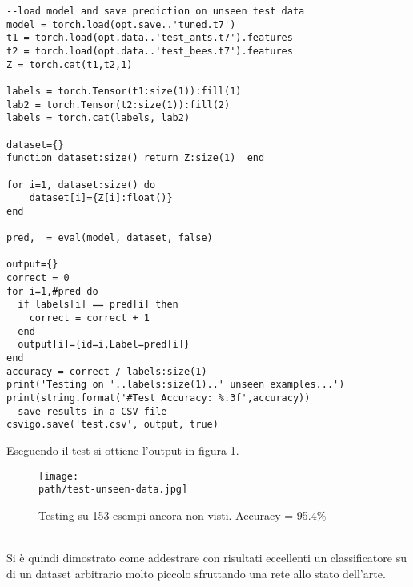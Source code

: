 \begin{lstlisting}[language={[5.2]Lua}]
--load model and save prediction on unseen test data
model = torch.load(opt.save..'tuned.t7')
t1 = torch.load(opt.data..'test_ants.t7').features
t2 = torch.load(opt.data..'test_bees.t7').features
Z = torch.cat(t1,t2,1)

labels = torch.Tensor(t1:size(1)):fill(1)
lab2 = torch.Tensor(t2:size(1)):fill(2)
labels = torch.cat(labels, lab2)

dataset={}
function dataset:size() return Z:size(1)  end

for i=1, dataset:size() do
    dataset[i]={Z[i]:float()}
end

pred,_ = eval(model, dataset, false)

output={}
correct = 0
for i=1,#pred do
  if labels[i] == pred[i] then
    correct = correct + 1
  end
  output[i]={id=i,Label=pred[i]}
end
accuracy = correct / labels:size(1)
print('Testing on '..labels:size(1)..' unseen examples...')
print(string.format('#Test Accuracy: %.3f',accuracy))
--save results in a CSV file
csvigo.save('test.csv', output, true)
\end{lstlisting}

Eseguendo il test si ottiene l'output in figura \ref{fig:res-test}. 
\begin{figure}[h!]
 \centering
 \texttt{[image: \\path/test-unseen-data.jpg]} 
 \caption{Testing su 153 esempi ancora non visti. Accuracy = 95.4\%}
 \label{fig:res-test}
\end{figure}
\\

Si è quindi dimostrato come addestrare con risultati eccellenti un classificatore su di un dataset arbitrario molto piccolo sfruttando una rete allo stato dell'arte. 


